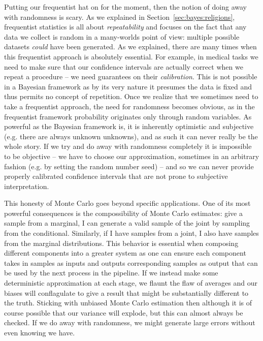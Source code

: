 Putting our frequentist hat on for the moment, then the notion of doing away with randomness is scary.
As we explained in Section~\ref{sec:bayes:religions},
frequentist statistics is all about \emph{repeatability} and focuses on the fact that any data we collect is random
in a many-worlds point of view: multiple possible
datasets \emph{could} have been generated.  As we explained, there are many times when this frequentist
approach is absolutely essential.  For example, in medical tasks we need
to make sure that our confidence intervals are actually correct when we repeat a procedure -- we need guarantees on
their \emph{calibration}.  This is not possible in a Bayesian framework as by its very nature it presumes the data
is fixed and thus permits no concept of repetition.  Once we realize that we sometimes need to take a frequentist
approach, the need for randomness becomes obvious, as in the frequentist framework probability originates only
through random variables.  As powerful as the Bayesian framework is, it is inherently optimistic and subjective
(e.g. there are always unknown unknowns), and as such it can never really be the whole story.  If we try and
do away with randomness completely it is impossible to be objective -- we have to choose our approximation, sometimes
in an arbitrary fashion (e.g. by setting the random number seed) -- and so we can never provide properly calibrated confidence 
intervals that are not prone to subjective interpretation.

This honesty of Monte Carlo goes beyond specific applications.  One of its most powerful consequences is the compossibility
of Monte Carlo estimates: give a sample from a marginal, I can generate a valid sample of the joint by sampling from the
conditional.  Similarly, if I have samples from a joint, I also have samples from the marginal distributions.  This behavior
is essential when composing different components into a greater system as one can ensure each component takes in
samples as inputs and outputs corresponding samples as output that can be used by the next process in the pipeline.
If we instead make some deterministic approximation at each stage, we flaunt the flaw of averages and our biases
will conflagulate to give a result that might be substantially different to the truth.  Sticking with unbiased Monte Carlo estimation
then although it is of course possible that our variance will explode, but this can almost always be checked.
If we do away with randomness, we might generate large errors without even knowing we have.

